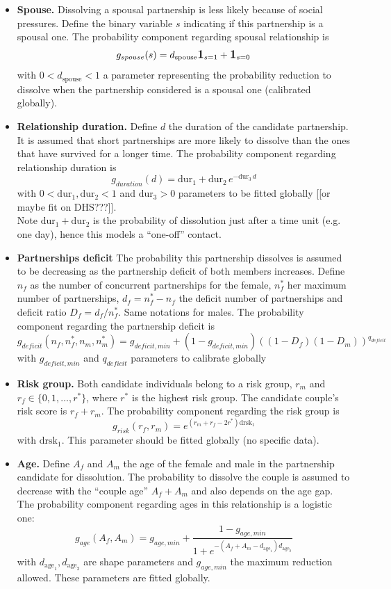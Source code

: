 \documentclass[11pt, onecolumn]{article}
\newcommand{\one}[1]{\textbf{\large{1}}_{#1}}
\begin{document}
\begin{itemize}
\item \textbf{Spouse.}
Dissolving a spousal partnership is less likely because of social pressures. Define the binary variable $s$ indicating if this partnership is a spousal one. The probability component regarding spousal relationship is
$$g_{spouse}(s) =d_{\mathrm{spouse}} \one{s=1}+ \one{s=0} $$
with $0<d_{\mathrm{spouse}}<1$ a parameter representing the probability reduction to dissolve when the partnership considered is a spousal one (calibrated globally).


\item \textbf{Relationship duration.}
Define $d$ the duration of the candidate partnership. It is assumed that short partnerships are more likely to dissolve than the ones that have survived for a longer time. 
The probability component regarding relationship duration is
$$g_{duration}(d) =\mathrm{dur}_1 + \mathrm{dur}_2 \, e^{-\mathrm{dur}_3\, d}$$
with $0<\mathrm{dur}_1,\mathrm{dur}_2<1$ and $\mathrm{dur}_3>0$ parameters to be fitted globally [[or maybe fit on DHS???]].\\
Note $\mathrm{dur}_1+\mathrm{dur}_2$ is the probability of dissolution just after a time unit (e.g. one day), hence this models a ``one-off'' contact.  

\item \textbf{Partnerships deficit}
The probability this partnership dissolves is assumed to be decreasing as the partnership deficit of both members increases. Define $n_f$ as the number of concurrent partnerships for the female, $n^*_f$ her maximum number of partnerships, $d_f=n^*_f-n_f$ the deficit number of partnerships and deficit ratio $D_f=d_f/n^*_f$. Same notations for males. The probability component regarding the partnership deficit is
$$g_{deficit}(n_f,n^*_f,n_m,n^*_m) = g_{deficit,min} + (1-g_{deficit,min})((1-D_f)(1- D_m))^{q_{deficit}}$$
with $g_{deficit,min}$ and $q_{deficit}$ parameters to calibrate globally

\item \textbf{Risk group.}
Both candidate individuals belong to a risk group, $r_m$ and $r_f\in \{0,1,...,r^*\}$, where $r^*$ is the highest risk group. The candidate couple's risk score is $r_f+r_m$. The probability component regarding the risk group is
$$g_{risk}(r_f,r_m) = e^{(r_m+r_f-2r^*)\mathrm{drsk}_1}  $$
with $\mathrm{drsk}_1$. This parameter should be fitted globally (no specific data).


\item \textbf{Age.} 
Define $A_f$ and $A_m$ the age of the female and male in the partnership candidate for dissolution. The probability to dissolve the couple is assumed to decrease with the ``couple age'' $A_f+A_m$ and also depends on the age gap.
The probability component regarding ages in this relationship is a logistic one:
$$g_{age}(A_f,A_m) =g_{age,min}+ \frac{1-g_{age,min}}{1+e^{-(A_f+A_m-d_{\mathrm{age}_1})d_{\mathrm{age}_2} }}$$
with $d_{\mathrm{age}_1},d_{\mathrm{age}_2}$ are shape parameters and $g_{age,min}$ the maximum reduction allowed. These parameters are fitted globally. 


\end{itemize}
\end{document}
